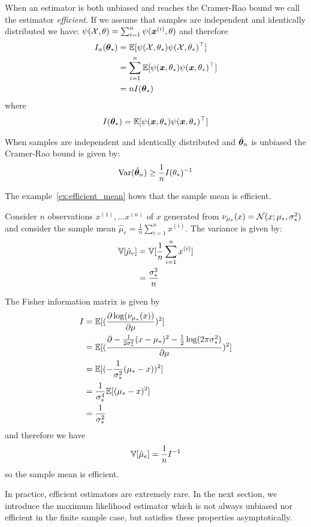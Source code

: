 When an estimator is both unbiased and reaches the Cramer-Rao bound we call the
estimator \emph{efficient}.
If we assume that samples are independent and identically distributed we
have: $\psi(\mathcal{X}, \theta) = \sum_{i=1}^n \psi(\boldsymbol{x}^{(i)}, \theta)$ and therefore
\begin{align}
  I_n(\boldsymbol{\theta}_*) &= \mathbb{E}[\psi(\mathcal{X}, \theta_*) \psi(\mathcal{X}, \theta_*)^{\top}] \\
               &= \sum_{i=1}^n \mathbb{E}[\psi(\boldsymbol{x}, \theta_*) \psi(\boldsymbol{x}, \theta_*)^{\top}] \\
               &= n I(\boldsymbol{\theta}_*)
\end{align}
where
\begin{align}
  I(\boldsymbol{\theta}_*) = \mathbb{E}[\psi(\boldsymbol{x}, \theta_*) \psi(\boldsymbol{x}, \theta_*)^{\top}]
\end{align}

When samples are independent and identically distributed and $\hat{\boldsymbol{\theta}}_n$ is unbiased the Cramer-Rao
bound is given by:
\begin{equation}
  \operatorname*{Var}(\hat{\boldsymbol{\theta}}_n) \geq \frac1{n} I(\theta_*)^{-1}
\end{equation}

The example~\ref{ex:efficient_mean} hows that the sample mean
is efficient.
\begin{example}
  \label{ex:efficient_mean}
  Consider $n$ observations $x^{(1)},
  \dots x^{(n)}$ of $x$ generated from $\nu_{\mu_*}(x) = \mathcal{N}(x; \mu_*, \sigma_*^2)$
  and consider the sample mean $\hat{\mu}_e = \frac1{n} \sum_{i=1}^n x^{(i)}$.
  The variance is given by:
  \begin{align}
    \mathbb{V}[\hat{\mu}_e] &= \mathbb{V}[\frac1{n} \sum_{i=1}^n x^{(i)}] \\
    &= \frac{\sigma_*^2}{n}
  \end{align}

  The Fisher information matrix is given by
  \begin{align}
    I &= \mathbb{E}[(\frac{ \partial \log(\nu_{\mu_*}(x))}{\partial \mu})^2] \\
      &= \mathbb{E}[(\frac{ \partial -\frac1{2 \sigma_*^2} (x - \mu_*)^2 - \frac12\log(2\pi \sigma_*^2)}{\partial \mu})^2] \\
      &= \mathbb{E}[(-\frac1{\sigma_*^2} (\mu_* - x))^2] \\
      &= \frac1{\sigma_*^4}\mathbb{E} [(\mu_* - x)^2] \\
      &= \frac1{\sigma_*^2}
  \end{align}
  and therefore we have
  \begin{equation}
  \mathbb{V}[\hat{\mu}_e]  = \frac1{n} I^{-1}
  \end{equation}
  so the sample mean is efficient.
\end{example}
In practice, efficient estimators are extremely rare. In the next section, we
introduce the maximum likelihood estimator which is not always unbiased nor
efficient in the finite sample case, but satisfies these properties asymptotically.

